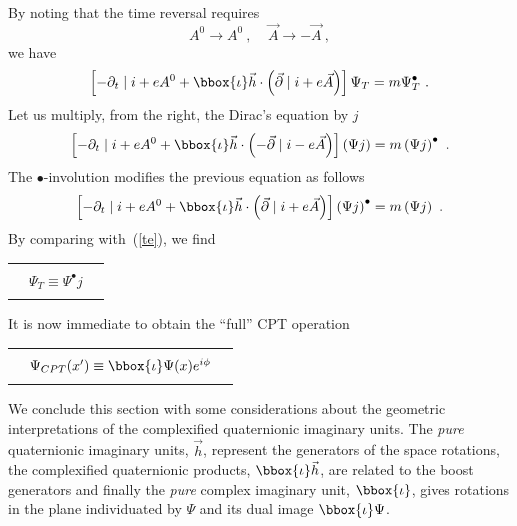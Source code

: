By noting that the time reversal requires
\[ A^0 \rightarrow A^0~,~~~~~\vec{A} \rightarrow -\vec{A}~,\]
we have
\begin{equation}
\label{te}
 \left[ -\partial_t \mid i + e A^0 + \bbox{\iota} \vec{h} \cdot 
 \left( \vec{\partial} \mid i + e \vec{A} \right) \right]
 \Psi_T  = m \Psi_T^{\bullet}~.
\end{equation}
Let us multiply, from the right, the Dirac's equation by $j$ 
\[ \left[ -\partial_t \mid i + e A^0 + \bbox{\iota} \vec{h} \cdot 
   \left( -\vec{\partial} \mid i - e \vec{A} \right) \right]
   \left( \Psi j \right)  = 
    m \left( \Psi j \right)^{\bullet}~. \]
The $\bullet$-involution modifies the previous equation as follows  
\[ \left[ -\partial_t \mid i + e A^0 + \bbox{\iota} \vec{h} \cdot 
   \left( \vec{\partial} \mid i + e \vec{A} \right) \right]
   \left( \Psi j \right)^{\bullet}  = 
    m \left( \Psi j \right)~. \]
By  comparing with~(\ref{te}), we find 
\begin{center}
\begin{tabular}{|c|} \hline \\ 
~~$\Psi_T \equiv \Psi^{\bullet} j$~~\\  \\
\hline
\end{tabular}
\end{center}

It is now immediate to obtain the ``full'' CPT operation
\begin{center}
\begin{tabular}{|c|} \hline \hline \\ 
~~$\Psi_{CPT}(x') \equiv \bbox{\iota} \Psi (x) e^{i\phi}$~~\\  \\
\hline \hline 
\end{tabular}
\end{center}

We conclude this section with some considerations about the geometric  
interpretations of the complexified quaternionic imaginary units.
The {\em pure} quaternionic imaginary units, $\vec{h}$, represent 
the generators of the space rotations, the complexified quaternionic 
products, $\bbox{\iota}\vec{h}$, are related to the boost generators and
finally the {\em pure} complex imaginary unit, $\bbox{\iota}$, gives 
rotations in the plane individuated by $\Psi$ and its dual image 
$\bbox{\iota} \Psi$.






